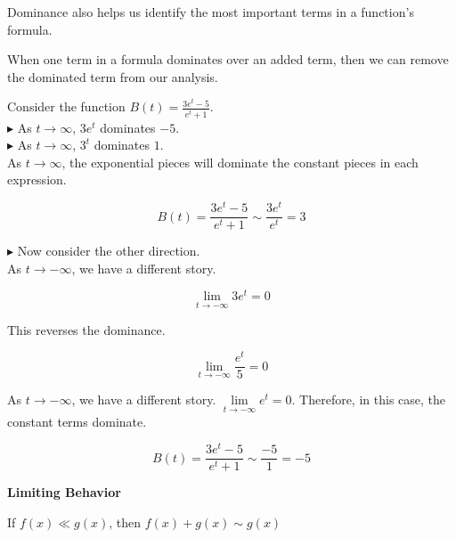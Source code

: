 \documentclass{ximera}
\begin{document}
Dominance also helps us identify the most important terms in a function's formula.


When one term in a formula dominates over an added term, then we can remove the dominated term from our analysis. \\






\begin{example}

Consider the function $B(t) = \frac{3e^t - 5}{e^t + 1}$. \\


$\blacktriangleright$ As $t \to \infty$, $3e^t$ dominates $-5$. \\

$\blacktriangleright$ As $t \to \infty$, $3^t$ dominates $1$. \\




As $t \to \infty$, the exponential pieces will dominate the constant pieces in each expression.  

\[   B(t) = \frac{3e^t - 5}{e^t + 1} \sim \frac{3 e^t}{e^t} = 3   \]




\textbf{\textcolor{blue!55!black}{$\blacktriangleright$}} Now consider the other direction. \\


As $t \to -\infty$, we have a different story.   



\[   \lim\limits_{t \to -\infty} 3 e^t  = 0  \]


This reverses the dominance.


\[   \lim\limits_{t \to -\infty} \frac{e^t}{5} = 0   \]



As $t \to -\infty$, we have a different story.  $\lim\limits_{t \to -\infty} e^t = 0$. Therefore, in this case, the constant terms dominate.


\[   B(t) = \frac{3e^t - 5}{e^t + 1} \sim \frac{-5}{1} = -5   \]








\end{example}




\begin{idea} \textbf{\textcolor{blue!55!black}{Limiting Behavior}}



If $f(x) \ll g(x)$, then $f(x) + g(x) \sim g(x)$



\end{idea}
\end{document}
